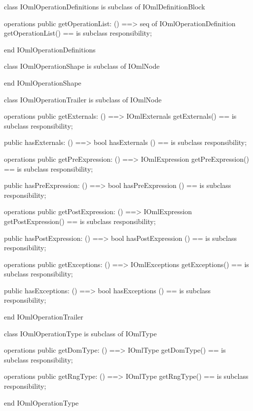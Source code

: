 \begin{vdm_al}
class IOmlOperationDefinitions
 is subclass of IOmlDefinitionBlock

operations
  public getOperationList: () ==> seq of IOmlOperationDefinition
  getOperationList() == is subclass responsibility;

end IOmlOperationDefinitions
\end{vdm_al}

\begin{vdm_al}
class IOmlOperationShape
 is subclass of IOmlNode

end IOmlOperationShape
\end{vdm_al}

\begin{vdm_al}
class IOmlOperationTrailer
 is subclass of IOmlNode

operations
  public getExternals: () ==> IOmlExternals
  getExternals() == is subclass responsibility;

  public hasExternals: () ==> bool
  hasExternals () == is subclass responsibility;

operations
  public getPreExpression: () ==> IOmlExpression
  getPreExpression() == is subclass responsibility;

  public hasPreExpression: () ==> bool
  hasPreExpression () == is subclass responsibility;

operations
  public getPostExpression: () ==> IOmlExpression
  getPostExpression() == is subclass responsibility;

  public hasPostExpression: () ==> bool
  hasPostExpression () == is subclass responsibility;

operations
  public getExceptions: () ==> IOmlExceptions
  getExceptions() == is subclass responsibility;

  public hasExceptions: () ==> bool
  hasExceptions () == is subclass responsibility;

end IOmlOperationTrailer
\end{vdm_al}

\begin{vdm_al}
class IOmlOperationType
 is subclass of IOmlType

operations
  public getDomType: () ==> IOmlType
  getDomType() == is subclass responsibility;

operations
  public getRngType: () ==> IOmlType
  getRngType() == is subclass responsibility;

end IOmlOperationType
\end{vdm_al}

